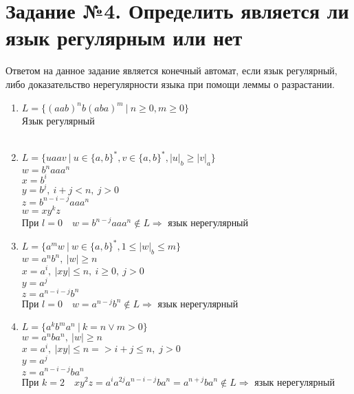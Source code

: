 \documentclass[a4paper, 12pt]{article}
\begin{document}
\section{Задание №4. Определить является ли язык регулярным или нет}
Ответом на данное задание является конечный автомат, если язык регулярный, либо доказательство нерегулярности языка при помощи леммы о разрастании.
\begin{enumerate}
    \item $L=\{(aab)^n b(aba)^m \ | \ n \geq 0, m \geq 0\}$
    \\
    Язык регулярный \\ 
     \\
    
    
    \item $L=\{uaav \ | \ u \in \{a,b\}^*, v \in \{a,b\}^*, \left| u \right|_b \geq  \left| v \right|_a\}$\\
    $w=b^naaa^n$\\
    $x=b^i$ \\
    $y=b^j,\ i+j < n, \ j>0$\\
    $z=b^{n-i-j}aaa^n$\\
    $w=xy^kz$ \\
    При $l=0 \quad w=b^{n-j}aaa^n \notin L \Rightarrow $ язык нерегулярный\\
    
    \item $L=\{ a^m w \ | \ w \in \{a, b\}^*, 1 \leq \left| w \right|_b \leq m\}$
    \\
    $w = a^n b^n, \ |w| \geq n$\\
    $x = a^i, \ |xy| \leq n, \ i \geq 0,\ j > 0$\\
    $y = a^j$\\
    $z = a^{n-i-j}b^n$\\
    При $l=0 \quad w=a^{n-j}b^n \notin L \Rightarrow $ язык нерегулярный\\
    
    \item $L=\{a^k b^m a^n \ | \  k=n \lor m>0\}$
    \\
    $w = a^n b a^n, \ |w| \geq n$ \\
    $x = a^i, \ |xy| \leq n  => i + j \leq n,\; j > 0$\\
    $y = a^j$\\
    $z = a^{n-i-j}ba^n$\\
    При $k = 2 \quad xy^2z = a^ia^{2j}a^{n-i-j}ba^n = a^{n+j}ba^n \notin L\Rightarrow $ язык нерегулярный\\
    

\end{enumerate}
\end{document}
